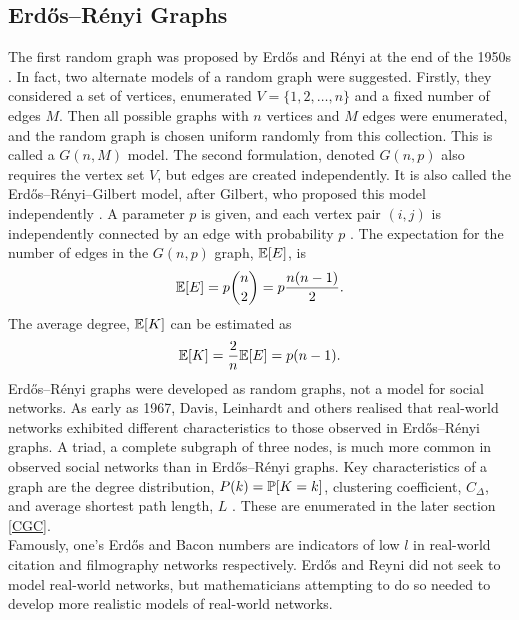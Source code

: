  \subsection{Erd\H{o}s--R\'enyi Graphs}
 The first random graph was proposed by Erd\H{o}s and R\'enyi at the end of the 1950s \cite{RN53}. In fact, two alternate models of a random graph were suggested. Firstly, they considered a set of vertices, enumerated $V = \{1,2,\dots,n\}$ and a fixed number of edges $M$. Then all possible graphs with $n$ vertices and $M$ edges were enumerated, and the random graph is chosen uniform randomly from this collection. This is called a $G(n,M)$ model. The second formulation, denoted $G(n,p)$ also requires the vertex set $V$, but edges are created independently. It is also called the Erd\H{o}s--R\'enyi--Gilbert model, after Gilbert, who proposed this model independently \cite{RN64}. A parameter $p$ is given, and each vertex pair $(i,j)$ is independently connected by an edge with probability $p$ \cite{RN56}. The expectation for the number of edges in the $G(n,p)$ graph, $\mathbb E [E]$, is 
 \begin{align*}
     \mathbb E [E] = p {n \choose 2} = p\frac{n(n-1)}{2}.
 \end{align*}The average degree, $\mathbb E [K]$ can be estimated as 
 \begin{align*}
     \mathbb E [K] = \frac{2}{n} \mathbb E [E] = p(n-1).
 \end{align*}
 Erd\H{o}s--R\'enyi graphs were developed as random graphs, not a model for social networks. As early as 1967, Davis, Leinhardt and others \cite{RN64} realised that real-world networks exhibited different characteristics to those observed in Erd\H{o}s--R\'enyi graphs. A triad, a complete subgraph of three nodes, is much more common in observed social networks than in Erd\H{o}s--R\'enyi graphs. Key characteristics of a graph are the degree distribution, $P(k) = \mathbb P [K=k]$, clustering coefficient, $C_\Delta$, and average shortest path length, $L$ \cite{RN53}. These are enumerated in the later section \ref{CGC}. \\
 
 Famously, one's Erd\H{o}s and Bacon numbers are indicators of low $l$ in real-world citation and filmography networks respectively. Erd\H{o}s and Reyni did not seek to model real-world networks, but mathematicians attempting to do so needed to develop more realistic models of real-world networks.\\
 
 
 


